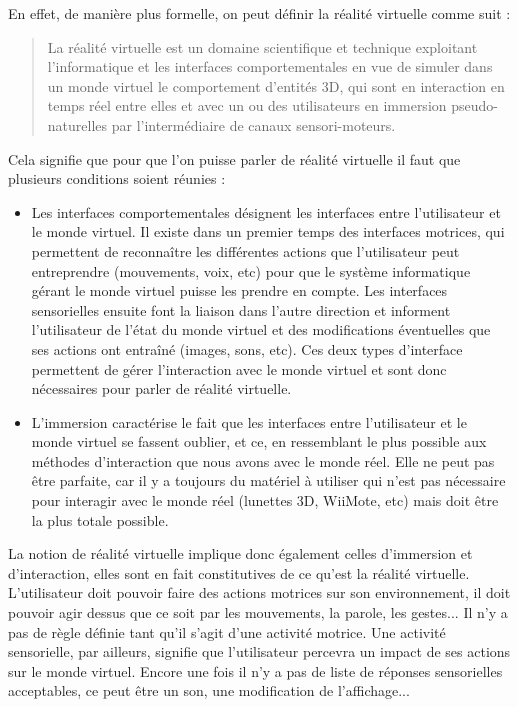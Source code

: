 En effet, de manière plus formelle, on peut définir la réalité virtuelle comme suit :\begin{quote}
La réalité virtuelle est un domaine scientifique et technique exploitant l'informatique et les interfaces comportementales en vue de simuler dans un monde virtuel le comportement d'entités 3D, qui sont en interaction en temps réel entre elles et avec un ou des utilisateurs en immersion pseudo-naturelles par l'intermédiaire de canaux sensori-moteurs.
\end{quote}
Cela signifie que pour que l'on puisse parler de réalité virtuelle il faut que plusieurs conditions soient réunies :	
\begin{itemize}
\item Les interfaces comportementales désignent les interfaces entre l'utilisateur et le monde virtuel. Il existe dans un premier temps des interfaces motrices, qui permettent de reconnaître les différentes actions que l'utilisateur peut entreprendre (mouvements, voix, etc) pour que le système informatique gérant le monde virtuel puisse les prendre en compte. Les interfaces sensorielles ensuite font la liaison dans l'autre direction et informent l'utilisateur de l'état du monde virtuel et des modifications éventuelles que ses actions ont entraîné (images, sons, etc). Ces deux types d'interface permettent de gérer l'interaction avec le monde virtuel et sont donc nécessaires pour parler de réalité virtuelle. 
\item L'immersion caractérise le fait que les interfaces entre l'utilisateur et le monde virtuel se fassent oublier, et ce, en ressemblant le plus possible aux méthodes d'interaction que nous avons avec le monde réel. Elle ne peut pas être parfaite, car il y a toujours du matériel à utiliser qui n'est pas nécessaire pour interagir avec le monde réel (lunettes 3D, WiiMote, etc) mais doit être la plus totale possible.
\end{itemize}


La notion de réalité virtuelle implique donc également celles d'immersion et d'interaction, elles sont en fait constitutives de ce  qu'est la réalité virtuelle. L'utilisateur doit pouvoir faire des actions motrices sur son environnement, il doit pouvoir agir dessus que ce soit par les mouvements, la parole, les gestes... Il n'y a pas de règle définie tant qu'il s'agit d'une activité motrice. 
Une activité sensorielle, par ailleurs, signifie que l'utilisateur percevra un impact de ses actions sur le monde virtuel. Encore une fois il n'y a pas de liste de réponses sensorielles acceptables, ce peut être un son, une modification de l'affichage...	%